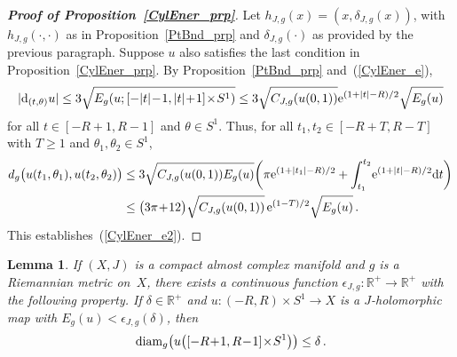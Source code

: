 \documentclass[11pt]{article}
\numberwithin{equation}{section}
\newtheorem{lmm}[thm]{Lemma}
\theoremstyle{definition}
\def\eref#1{(\ref{#1})}
\def\lra{\longrightarrow}
\def\R{\mathbb R}
\def\de{\delta}
\def\ep{\epsilon}
\def\th{\theta}
\def\diam{\textnormal{diam}}
\def\nd{\textnormal{d}}
\def\ne{\textnormal{e}}
\begin{document}
\begin{proof}[{\bf\emph{Proof of Proposition~\ref{CylEner_prp}}}]
\noindent
Let $h_{J,g}(x)\!=\!(x,\de_{J,g}(x))$,
with $h_{J,g}(\cdot,\cdot)$ as in Proposition~\ref{PtBnd_prp}
and $\de_{J,g}(\cdot)$ as provided by the previous paragraph.
Suppose $u$ also satisfies the last condition in Proposition~\ref{CylEner_prp}.
By Proposition~\ref{PtBnd_prp} and~\eref{CylEner_e},
$$|\nd_{(t,\th)}u|\le 3\sqrt{E_g(u;[-|t|\!-\!1,|t|\!+\!1]\!\times\!S^1)}
\le 3\sqrt{C_{J,g}(u(0,1))}\ne^{(1+|t|-R)/2}\sqrt{E_g(u)}$$
for all $t\in[-R\!+\!1,R\!-\!1]$ and $\th\!\in\!S^1$.
Thus, for all $t_1,t_2\!\in\![-R\!+\!T,R\!-\!T]$ with $T\!\ge\!1$ and 
$\th_1,\th_2\!\in\!S^1$,
\begin{equation*}\begin{split}
d_g\big(u(t_1,\th_1),u(t_2,\th_2)\big)
&\le 3\sqrt{C_{J,g}(u(0,1))E_g(u)}
\bigg(\pi\ne^{(1+|t_1|-R)/2}+\int_{t_1}^{t_2}\!\ne^{(1+|t|-R)/2}\nd t\bigg)\\
&\le \big(3\pi\!+\!12\big) \sqrt{C_{J,g}(u(0,1))}\,\ne^{(1-T)/2}\sqrt{E_g(u)}\,.
\end{split}\end{equation*}
This establishes~\eref{CylEner_e2}. 
\end{proof}


\begin{lmm}\label{CylCoord_lmm}
If $(X,J)$ is a compact almost complex manifold and $g$ is a Riemannian metric on~$X$,
there exists a continuous function $\ep_{J,g}\!:\R^+\!\lra\!\R^+$ 
with the following property.
If  $\de\!\in\!\R^+$  and  \hbox{$u\!:(-R,R)\!\times\!S^1\!\lra\!X$} is a $J$-holomorphic map
with $E_g(u)\!<\ep_{J,g}(\de)$, then
$$\diam_g\big(u\big([-R\!+\!1,R\!-\!1]\!\times\!S^1\big)\big)\le \de\,.$$
\end{lmm}
\end{document}
